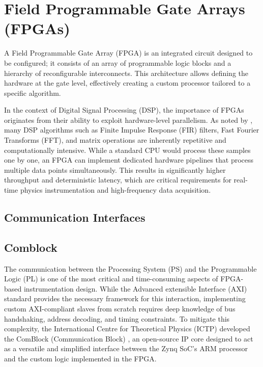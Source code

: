 \section{Field Programmable Gate Arrays (FPGAs)}

A Field Programmable Gate Array (FPGA) is an integrated circuit designed to be configured; it consists of an array of programmable logic blocks and a hierarchy of reconfigurable interconnects. This architecture allows defining the hardware at the gate level, effectively creating a custom processor tailored to a specific algorithm.


In the context of Digital Signal Processing (DSP), the importance of FPGAs originates from their ability to exploit hardware-level parallelism. As noted by \cite[pp. 1--14]{FPGAbasedImplementationSignal2008}, many DSP algorithms such as Finite Impulse Response (FIR) filters, Fast Fourier Transforms (FFT), and matrix operations are inherently repetitive and computationally intensive. While a standard CPU would process these samples one by one, an FPGA can implement dedicated hardware pipelines that process multiple data points simultaneously. This results in significantly higher throughput and deterministic latency, which are critical requirements for real-time physics instrumentation and high-frequency data acquisition.






\subsection{Communication Interfaces}



\subsection{Comblock} \label{sec:comblock}

The communication between the Processing System (PS) and the Programmable Logic (PL) is one of the most critical and time-consuming aspects of FPGA-based instrumentation design. While the Advanced extensible Interface (AXI) standard provides the necessary framework for this interaction, implementing custom AXI-compliant slaves from scratch requires deep knowledge of bus handshaking, address decoding, and timing constraints. To mitigate this complexity, the International Centre for Theoretical Physics (ICTP) developed the ComBlock (Communication Block) \cite{FilesMasterRodrigo2021}, an open-source IP core designed to act as a versatile and simplified interface between the Zynq SoC's ARM processor and the custom logic implemented in the FPGA.


